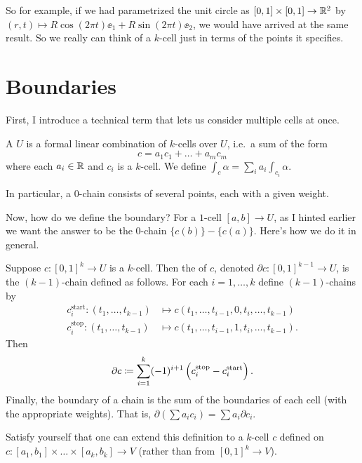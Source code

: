 So for example, if we had parametrized the unit circle as $[0,1] \times [0,1] \to \mathbb R^2$
by $(r,t) \mapsto R\cos(2\pi t) \ee_1 + R\sin(2\pi t) \ee_2$, we would have arrived at the same result.
So we really can think of a $k$-cell just in terms of the points it specifies.

\section{Boundaries}
First, I introduce a technical term that lets us consider multiple cells at once.
\begin{definition}
	A  $U$ is a formal
	linear combination of $k$-cells over $U$,
	i.e.\ a sum of the form
	\[ c = a_1 c_1 + \dots + a_m c_m \]
	where each $a_i \in \mathbb R$ and $c_i$ is a $k$-cell.
	We define $\int_c \alpha = \sum_i a_i \int_{c_i} \alpha$.
\end{definition}
In particular, a $0$-chain consists of several points, each with a given weight.

Now, how do we define the boundary?
For a $1$-cell $[a,b] \to U$, as I hinted earlier we want the answer to be the $0$-chain $\{c(b)\}-\{c(a)\}$.
Here's how we do it in general.
\begin{definition}
	Suppose $c \colon [0,1]^k \to U$ is a $k$-cell.
	Then the  of $c$, denoted $\partial c \colon [0,1]^{k-1} \to U$,
	is the $(k-1)$-chain defined as follows.
	For each $i = 1,\dots,k$ define $(k-1)$-chains by
	\begin{align*}
		c_i^{\text{start}} \colon (t_1, \dots, t_{k-1}) &\mapsto
			c(t_1, \dots, t_{i-1}, 0, t_i, \dots, t_{k-1}) \\
		c_i^{\text{stop}} \colon (t_1, \dots, t_{k-1}) & \mapsto
			c(t_1, \dots, t_{i-1}, 1, t_i, \dots, t_{k-1}).
	\end{align*}
	Then
	\[ \partial c \coloneqq
	\sum_{i=1}^k (-1)^{i+1} \left( c_i^{\text{stop}} - c_i^{\text{start}}  \right). \]
	Finally, the boundary of a chain is the sum of the boundaries of each cell (with the appropriate weights).
	That is, $\partial(\sum a_ic_i) = \sum a_i \partial c_i$.
\end{definition}
\begin{ques}
	Satisfy yourself that one can extend this definition to
	a $k$-cell $c$ defined on $c \colon [a_1, b_1] \times \dots \times [a_k, b_k] \to V$
	(rather than from $[0,1]^k \to V$).
\end{ques}


